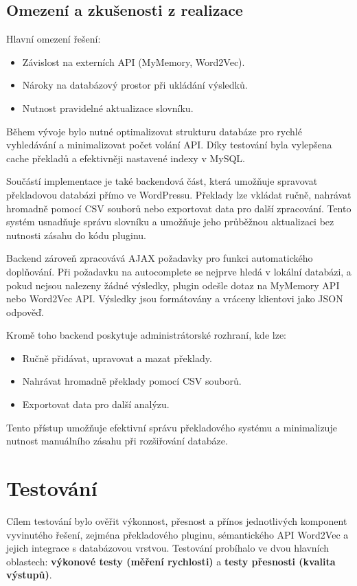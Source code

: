 \documentclass[czech, ba, kiv, he]{fasthesis}
\begin{document}
\section{Omezení a zkušenosti z realizace}
Hlavní omezení řešení:

\begin{itemize}
    \item Závislost na externích API (MyMemory, Word2Vec).
    \item Nároky na databázový prostor při ukládání výsledků.
    \item Nutnost pravidelné aktualizace slovníku.
\end{itemize}

Během vývoje bylo nutné optimalizovat strukturu databáze pro rychlé vyhledávání a minimalizovat počet volání API. Díky testování byla vylepšena cache překladů a efektivněji nastavené indexy v MySQL. 

Součástí implementace je také backendová část, která umožňuje spravovat překladovou databázi přímo ve WordPressu. Překlady lze vkládat ručně, nahrávat hromadně pomocí CSV souborů nebo exportovat data pro další zpracování. Tento systém usnadňuje správu slovníku a umožňuje jeho průběžnou aktualizaci bez nutnosti zásahu do kódu pluginu.

Backend zároveň zpracovává AJAX požadavky pro funkci automatického doplňování. Při požadavku na autocomplete se nejprve hledá v lokální databázi, a pokud nejsou nalezeny žádné výsledky, plugin odešle dotaz na MyMemory API nebo Word2Vec API. Výsledky jsou formátovány a vráceny klientovi jako JSON odpověď.

Kromě toho backend poskytuje administrátorské rozhraní, kde lze:
\begin{itemize}
    \item Ručně přidávat, upravovat a mazat překlady.
    \item Nahrávat hromadně překlady pomocí CSV souborů.
    \item Exportovat data pro další analýzu.
\end{itemize}

Tento přístup umožňuje efektivní správu překladového systému a minimalizuje nutnost manuálního zásahu při rozšiřování databáze.


\chapter{Testování}

Cílem testování bylo ověřit výkonnost, přesnost a přínos jednotlivých komponent vyvinutého řešení, zejména překladového pluginu, sémantického API Word2Vec a jejich integrace s databázovou vrstvou. Testování probíhalo ve dvou hlavních oblastech: \textbf{výkonové testy (měření rychlosti)} a \textbf{testy přesnosti (kvalita výstupů)}.
\end{document}
